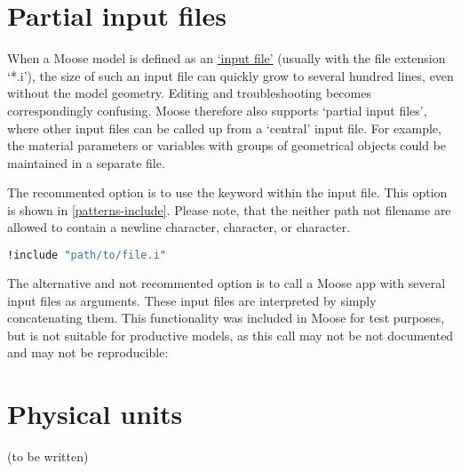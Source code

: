 \section{Partial input files}
\label{chap:patterns-partial-input-files}

When a Moose model is defined as an
\href{https://mooseframework.inl.gov/application_usage/input_syntax.html}{‘input
    file’} (usually with the file extension ‘*.i’), the size of such an input file
can quickly grow to several hundred lines, even without the model geometry.
Editing and troubleshooting becomes correspondingly confusing. Moose therefore
also supports ‘partial input files’, where other input files can be called up
from a ‘central’ input file. For example, the material parameters or variables
with groups of geometrical objects could be maintained in a separate file.

The recommented option is to use the  keyword within the
input file. This option is shown in \autoref{patterns-include}. Please note,
that the neither path not filename are allowed to contain a newline character,
\codeword{#} character, or \codeword{[} character.

\begin{lstlisting}[language=perl, caption={Include anpther input file},label={patterns-include}]
!include "path/to/file.i"
\end{lstlisting}

The alternative and not recommented option is to call a Moose app with several
input files as arguments. These input files are interpreted by simply
concatenating them. This functionality was included in Moose for test purposes,
but is not suitable for productive models, as this call may not be not
documented and may not be reproducible:


\section{Physical units}
\label{chap:patterns-physical-units}

(to be written)

